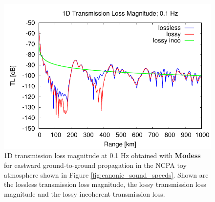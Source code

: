 \begin{figure}[h]
\begin{center}
\includegraphics[scale=0.60]{figs/modess_ex1}
\end{center}
\caption{1D transmission loss magnitude at 0.1 Hz obtained with {\bf Modess} for eastward ground-to-ground propagation in the NCPA toy atmosphere shown in Figure \ref{fig:canonic_sound_speeds}. Shown are the lossless transmission loss magnitude, the lossy transmission loss magnitude and the lossy incoherent transmission loss.}
\label{fig: modess 1D tl}
\end{figure}


